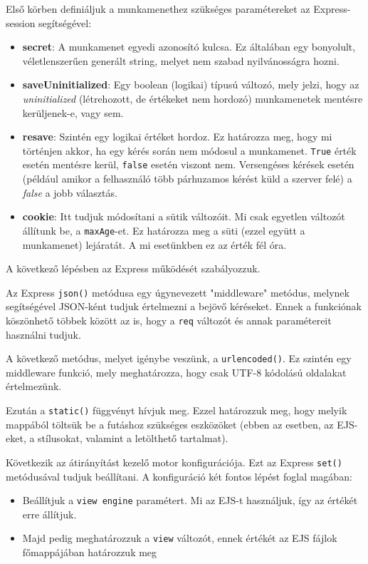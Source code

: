 Első körben definiáljuk a munkamenethez szükséges paramétereket az Express-session segítségével:
\begin{itemize}
\item{\textbf{secret}: A munkamenet egyedi azonosító kulcsa. Ez általában egy bonyolult, véletlenszerűen generált string, melyet nem szabad nyilvánosságra hozni.}
\item{\textbf{saveUninitialized}: Egy boolean (logikai) típusú változó, mely jelzi, hogy az \textit{uninitialized} (létrehozott, de értékeket nem hordozó) munkamenetek mentésre kerüljenek-e, vagy sem.}
\item{\textbf{resave}: Szintén egy logikai értéket hordoz. Ez határozza meg, hogy mi történjen akkor, ha egy kérés során nem módosul a munkamenet. \texttt{True} érték esetén mentésre kerül, \texttt{false} esetén viszont nem. Versengéses kérések esetén (például amikor a felhasználó több párhuzamos kérést küld a szerver felé) a \textit{false} a jobb választás.}
\item{\textbf{cookie}: Itt tudjuk módosítani a sütik változóit. Mi csak egyetlen változót állítunk be, a \texttt{maxAge}-et. Ez határozza meg a süti (ezzel együtt a munkamenet) lejáratát. A mi esetünkben ez az érték fél óra.}
\end{itemize}

\noindent
A következő lépésben az Express működését szabályozzuk.

Az Express \texttt{json()} metódusa egy úgynevezett "middleware" metódus, melynek segítségével JSON-ként tudjuk értelmezni a bejövő kéréseket. Ennek a funkciónak köszönhető többek között az is, hogy a \texttt{req} változót és annak paramétereit használni tudjuk.

A következő metódus, melyet igénybe veszünk, a \texttt{urlencoded()}. Ez szintén egy middleware funkció, mely meghatározza, hogy csak UTF-8 kódolású oldalakat értelmezünk.

Ezután a \texttt{static()} függvényt hívjuk meg. Ezzel határozzuk meg, hogy melyik mappából töltsük be a futáshoz szükséges eszközöket (ebben az esetben, az EJS-eket, a stílusokat, valamint a letölthető tartalmat).

Következik az átirányítást kezelő motor konfigurációja. Ezt az Express \texttt{set()} metódusával tudjuk beállítani. A konfiguráció két fontos lépést foglal magában:
\begin{itemize}
\item{Beállítjuk a \texttt{view engine} paramétert. Mi az EJS-t használjuk, így az értékét erre állítjuk.}
\item{Majd pedig meghatározzuk a \texttt{view} változót, ennek értékét az EJS fájlok főmappájában határozzuk meg}
\end{itemize}

